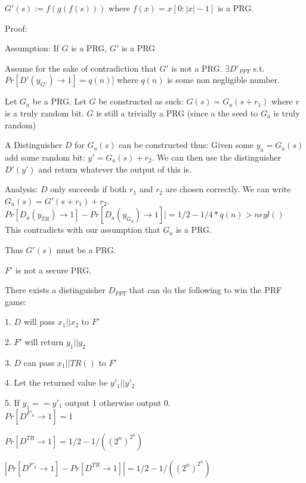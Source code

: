\documentclass[12pt]{article}
\newenvironment{question}[2][Question]{\begin{trivlist}
		\item[\hskip \labelsep {\bfseries #1}\hskip \labelsep {\bfseries #2.}]}{\end{trivlist}}
\begin{document}
	\begin{question}{2b}
		$G'(s):=f(g(f(s)))$ where $f(x)=x[0:|x|-1]$ is a PRG.
		
		Proof:
		
		\hspace{\parindent} Assumption: If $G$ is a PRG, $G'$ is a PRG
		
		
		\hspace{\parindent} Assume for the sake of contradiction that $G'$ is not a PRG. $\exists D'_{PPT}$ s.t. $Pr[D'(y_{G'})\rightarrow1] = q(n)]$ where $q(n)$ is some non negligible number. 
		
		Let $G_a$ be a PRG. Let $G$ be constructed as such: $G(s)=G_a(s+r_1)$ where $r$ is a truly random bit. $G$ is still a trivially a PRG (since a the seed to $G_a$ is truly random)
		
		A Distinguisher $D$ for $G_a(s)$ can be constructed thus:
			Given some $y_a=G_a(s)$ add some random bit: $y'=G_a(s) + r_2$. We can then use the distinguisher $D'(y')$ and return whatever the output of this is. 
			
			Analysis:
				$D$ only succeeds if both $r_1$ and $r_2$ are chosen correctly. We can write $G_a(s)=G'(s+r_1)+r_2$. \\
				
				$Pr[D_a(y_{TR}) \rightarrow 1]  - Pr[D_a(y_{G_a}) \rightarrow 1] |= 1/2 - 1/4 * q(n) > negl()$\\
				
				This contradicts with our assumption that $G_a$ is a PRG.
				
				Thus $G'(s)$ must be a PRG.

		
		
	\end{question}	

	\begin{question}{3a}
		$F'$ is not a secure PRG.
		
		There exists a distinguisher $D_{PPT}$ that can do the following to win the PRF game:
		
		\hspace{\parindent} 1. $D$ will pass $x_1||x_2$ to $F'$
		
		\hspace{\parindent} 2. $F'$ will return $y_1||y_2$
		
		\hspace{\parindent} 3. $D$ can pass $x_1||TR()$ to $F'$
		
		\hspace{\parindent} 4. Let the returned value be $y'_1||y'_2$
		
		\hspace{\parindent} 5. If $y_1 == y'_1$ output 1 otherwise output 0. \\
		
		$Pr[D^{F'_k} \rightarrow 1] = 1$
		
		$Pr[D^{TR} \rightarrow 1] = 1/2 - 1/((2^n)^{2^n})$
		
		$|Pr[D^{F'_k} \rightarrow 1] - Pr[D^{TR} \rightarrow 1]| = 1/2 - 1/((2^n)^{2^n})$ 
		
	\end{question}
\end{document}
